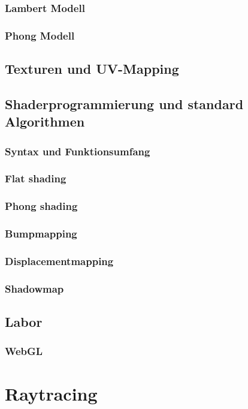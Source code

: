 \documentclass[]{article}
\begin{document}
\subsubsection{Lambert  Modell}
\subsubsection{Phong Modell}

\subsection{Texturen und UV-Mapping}
\subsection{Shaderprogrammierung und standard Algorithmen}
\subsubsection{Syntax und Funktionsumfang}
\subsubsection{Flat  shading}
\subsubsection{Phong  shading}
\subsubsection{Bumpmapping}
\subsubsection{Displacementmapping}
\subsubsection{Shadowmap}

\subsection{Labor}
\subsubsection{WebGL}





\section{Raytracing}
\end{document}
